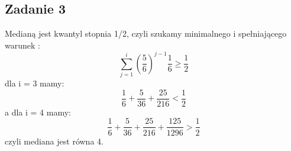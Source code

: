 \subsection{Zadanie 3}
Medianą jest kwantyl stopnia 1/2, czyli szukamy minimalnego i spełniającego warunek :
$$
 \sum_{j=1}^{i} \left( \frac{5}{6}\right)^{j-1}\frac{1}{6} \ge \frac{1}{2}
$$
dla i = 3 mamy: 
$$
\frac{1}{6} + \frac{5}{36} + \frac{25}{216} < \frac{1}{2}
$$
a dla i = 4 mamy: 
$$
\frac{1}{6} + \frac{5}{36} + \frac{25}{216} + \frac{125}{1296} > \frac{1}{2}
$$
czyli mediana jest równa 4.
